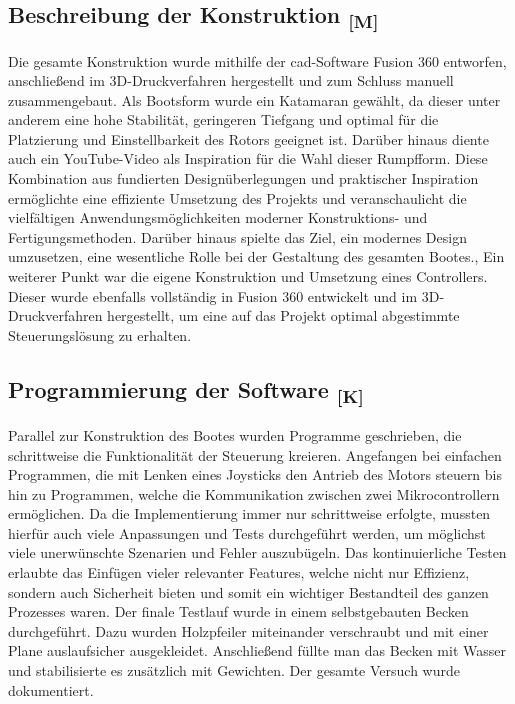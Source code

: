 \documentclass[a4paper,12pt]{article}
\begin{document}
\subsection*{\texorpdfstring{Beschreibung der Konstruktion \textsubscript{[M]}}{Beschreibung der Konstruktion [M]}}
\label{sec:Beschreibung der Konstruktion}
Die gesamte Konstruktion wurde mithilfe der \gls{cad}-Software Fusion 360 entworfen, anschließend im 3D-Druckverfahren hergestellt und zum Schluss manuell zusammengebaut. Als Bootsform wurde ein Katamaran gewählt, da dieser unter anderem eine hohe Stabilität, geringeren Tiefgang und optimal für die Platzierung und Einstellbarkeit des Rotors 
geeignet ist. Darüber hinaus diente auch ein YouTube-Video als Inspiration für die Wahl dieser Rumpfform. Diese Kombination aus fundierten Designüberlegungen und praktischer Inspiration ermöglichte eine effiziente Umsetzung des Projekts und veranschaulicht die vielfältigen Anwendungsmöglichkeiten moderner Konstruktions- und Fertigungsmethoden. Darüber hinaus spielte das Ziel, ein modernes Design umzusetzen, eine wesentliche Rolle bei der Gestaltung des gesamten Bootes.\cite{Website:Youtube}, \newline
Ein weiterer Punkt war die eigene Konstruktion und Umsetzung eines Controllers. Dieser wurde ebenfalls vollständig in Fusion 360 entwickelt und im 3D-Druckverfahren hergestellt, um eine auf das Projekt optimal abgestimmte Steuerungslösung zu erhalten.
\subsection*{\texorpdfstring{Programmierung der Software \textsubscript{[K]}}{Programmierung der Software [K]}}
\label{sec:Programmierung der Software}
Parallel zur Konstruktion des Bootes wurden Programme geschrieben, die schrittweise die Funktionalität der Steuerung kreieren. Angefangen bei einfachen Programmen, die mit Lenken eines Joysticks den Antrieb des Motors steuern bis hin zu Programmen, welche die Kommunikation zwischen zwei Mikrocontrollern ermöglichen. Da die Implementierung immer nur schrittweise erfolgte, mussten hierfür auch viele Anpassungen und Tests durchgeführt werden, um möglichst viele unerwünschte Szenarien und Fehler auszubügeln. Das kontinuierliche Testen erlaubte das Einfügen vieler relevanter Features, welche nicht nur Effizienz, sondern auch Sicherheit bieten und somit ein wichtiger Bestandteil des ganzen Prozesses waren. 
Der finale Testlauf wurde in einem selbstgebauten Becken durchgeführt. Dazu wurden Holzpfeiler miteinander verschraubt und mit einer Plane auslaufsicher ausgekleidet. Anschließend füllte man das Becken mit Wasser und stabilisierte es zusätzlich mit Gewichten. Der gesamte Versuch wurde dokumentiert.
\newpage
\end{document}
